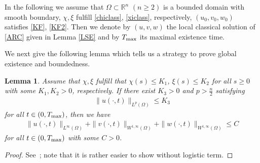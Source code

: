 \documentclass[12pt,reqno,draft]{article}
\numberwithin{equation}{section}
\theoremstyle{theorem}
\newtheorem{lem}[thm]{Lemma}
\theoremstyle{definition}
\newcommand{\R}{\mathbb{R}}
\newcommand{\Tmax}{T_{\rm max}}
\begin{document}
In the following we assume that $\Omega \subset \R^n$ 
$(n \ge 2)$ 
is a bounded domain with smooth boundary, 
$\chi, \xi$ fulfill \eqref{chiclass}, \eqref{xiclass}, respectively,  
$(u_0, v_0, w_0)$ satisfies \eqref{KF}, \eqref{KF2}. Then we
denote by $(u, v, w)$ the local classical
solution of \eqref{ARC} given in Lemma \ref{LSE} and 
by $\Tmax$ its maximal existence time. 
\vspace{2mm}

We next give the following lemma which tells 
us a strategy to prove global existence and boundedness. 
%
\begin{lem} \label{bddu}
 Assume that $\chi, \xi$ fulfill that $\chi(s) \le K_1$,   
 $\xi(s) \le K_2$ for all $s \ge 0$ with some $K_1, K_2>0$, respectively.  
 If there exist $K_3>0$ and $p>\frac{n}{2}$ satisfying
%
    \begin{align*}
            \|u(\cdot, t)\|_{L^p(\Omega)} \le K_3
    \end{align*}
% 
 for all $t \in (0, \Tmax)$, then we have 
% 
    \begin{align*} %
            \|u(\cdot,t)\|_{L^\infty(\Omega)}
                           +\|v(\cdot,t)\|_{W^{1, \infty}(\Omega)}
                           +\|w(\cdot,t)\|_{W^{1, \infty}(\Omega)} \le C
    \end{align*}
 for all $t \in (0, \Tmax)$ with some $C>0$.
\end{lem}
%
\begin{proof} 
See~\cite[Lemma~2.3]{CMY-2020}; 
note that it is rather easier to show without logistic term.
\end{proof}
\vspace{5mm}

\end{document}
